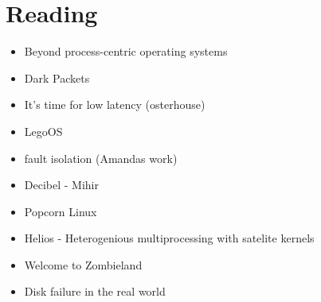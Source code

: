 \section{Reading}
\begin{itemize}
    \item{Beyond process-centric operating systems}~\cite{189914}\rpaper{}
    \item{Dark Packets}\rabstract{}
    \item{It's time for low latency (osterhouse)}
    \item{LegoOS}\rintro{}
    \item{fault isolation (Amandas work)}\rintro{}
    \item{Decibel - Mihir}\rabstract{}
    \item{Popcorn Linux}
    \item{Helios - Heterogenious multiprocessing with satelite kernels}~\cite{helios}\rabstract{}
    \item{Welcome to Zombieland}~\cite{zombieland}\rintro{}
    \item{Disk failure in the real world}~\cite{Schroeder:2007:DFR:1267903.1267904}\rabstract{}

\end{itemize}
